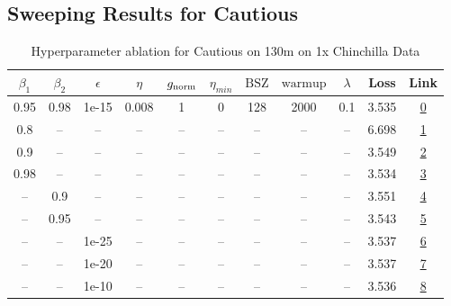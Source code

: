 \subsection{Sweeping Results for Cautious}%
\begin{table}[H]
\centering
\caption{Hyperparameter ablation for Cautious on 130m on 1x Chinchilla Data}
\label{tab:ablation_cautious_130m_on_1x_chinchilla_data}
\begin{tabular}{ccccccccccc}
\toprule
$\beta_1$ & $\beta_2$ & $\epsilon$ & $\eta$ & $g_{\mathrm{norm}}$ & $\eta_{min}$ & $\mathrm{BSZ}$ & $\mathrm{warmup}$ & $\lambda$ & Loss & Link \\
\midrule
0.95 & 0.98 & 1e-15 & 0.008 & 1 & 0 & 128 & 2000 & 0.1 & 3.535 & \href{https://wandb.ai/marin-community/optimizer-scaling/runs/sweep-130m-2B-cautious7b0572lr0.008-wd0.1-minlr0-warmup2000-b10.-085cb0}{0} \\
\midrule
0.8 & -- & -- & -- & -- & -- & -- & -- & -- & 6.698 & \href{https://wandb.ai/marin-community/optimizer-scaling/runs/sweep-130m-2B-cautious90e2dblr0.008-wd0.1-minlr0-warmup2000-b10.-3a5e65}{1} \\
0.9 & -- & -- & -- & -- & -- & -- & -- & -- & 3.549 & \href{https://wandb.ai/marin-community/optimizer-scaling/runs/sweep-130m-2B-cautious5fbf2flr0.008-wd0.1-minlr0-warmup2000-b10.-8d12f3}{2} \\
0.98 & -- & -- & -- & -- & -- & -- & -- & -- & 3.534 & \href{https://wandb.ai/marin-community/optimizer-scaling/runs/sweep-130m-2B-cautiousd41969lr0.008-wd0.1-minlr0-warmup2000-b10.-7d014c}{3} \\
-- & 0.9 & -- & -- & -- & -- & -- & -- & -- & 3.551 & \href{https://wandb.ai/marin-community/optimizer-scaling/runs/sweep-130m-2B-cautious87fa48lr0.008-wd0.1-minlr0-warmup2000-b10.-dff836}{4} \\
-- & 0.95 & -- & -- & -- & -- & -- & -- & -- & 3.543 & \href{https://wandb.ai/marin-community/optimizer-scaling/runs/sweep-130m-2B-cautious04bad0lr0.008-wd0.1-minlr0-warmup2000-b10.-15c6af}{5} \\
-- & -- & 1e-25 & -- & -- & -- & -- & -- & -- & 3.537 & \href{https://wandb.ai/marin-community/optimizer-scaling/runs/sweep-130m-2B-cautious2a7d1dlr0.008-wd0.1-minlr0-warmup2000-b10.-ff7d5f}{6} \\
-- & -- & 1e-20 & -- & -- & -- & -- & -- & -- & 3.537 & \href{https://wandb.ai/marin-community/optimizer-scaling/runs/sweep-130m-2B-cautious24891dlr0.008-wd0.1-minlr0-warmup2000-b10.-883f16}{7} \\
-- & -- & 1e-10 & -- & -- & -- & -- & -- & -- & 3.536 & \href{https://wandb.ai/marin-community/optimizer-scaling/runs/sweep-130m-2B-cautious8f13a4lr0.008-wd0.1-minlr0-warmup2000-b10.-3b6c32}{8} \\

\end{tabular}
\end{table}

